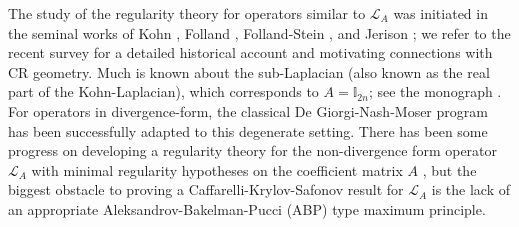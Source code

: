 \documentclass[12pt]{amsart}
\def \L {\mathcal{L}}
\begin{document}
The study of the regularity theory for operators similar to $\L_A$ was initiated in the seminal works of Kohn \cite{Kohn65}, Folland \cite{Folland73, Folland75}, Folland-Stein  \cite{FollandStein74}, and Jerison \cite{Jerison81-1, Jerison81-2}; we refer to the recent survey \cite{Folland2021} for a detailed historical account and motivating connections with CR geometry. Much is known about the sub-Laplacian (also known as the real part of the Kohn-Laplacian), which corresponds to $A = \mathbb{I}_{2n}$; see the monograph \cite{BLU2007}. For operators in divergence-form, the classical De Giorgi-Nash-Moser program has been successfully adapted to this degenerate setting. There has been some progress on developing a regularity theory for the non-divergence form operator $\L_A$ with minimal regularity hypotheses on the coefficient matrix $A$ \cite{AGT2017, GT2011, T2014}, but the biggest obstacle to proving a Caffarelli-Krylov-Safonov result for $\L_A$ is the lack of an appropriate Aleksandrov-Bakelman-Pucci (ABP) type maximum principle.  
\end{document}
